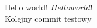 \documentclass[12pt]{article}
\begin{document}
Hello world!
$Hello world!$ %
\\Kolejny commit testowy
\end{document}
